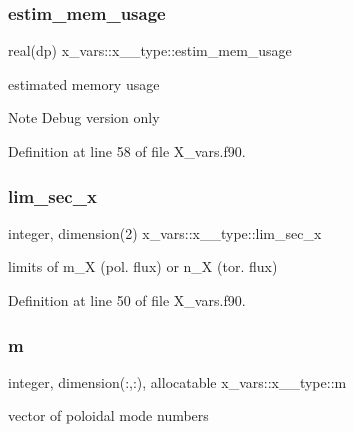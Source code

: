 \subsubsection{\texorpdfstring{estim\+\_\+mem\+\_\+usage}{estim\_mem\_usage}}
{\footnotesize\ttfamily real(dp) x\+\_\+vars\+::x\+\_\+\_\+type\+::estim\+\_\+mem\+\_\+usage}



estimated memory usage 

\begin{DoxyNote}{Note}
Debug version only 
\end{DoxyNote}


Definition at line 58 of file X\+\_\+vars.\+f90.

\mbox{\label{structx__vars_1_1x__1__type_a13c0f5a062916cf55e6bbaa906d0245b}} 
\subsubsection{\texorpdfstring{lim\+\_\+sec\+\_\+x}{lim\_sec\_x}}
{\footnotesize\ttfamily integer, dimension(2) x\+\_\+vars\+::x\+\_\+\_\+type\+::lim\+\_\+sec\+\_\+x}



limits of {\ttfamily m\+\_\+X} (pol. flux) or {\ttfamily n\+\_\+X} (tor. flux) 



Definition at line 50 of file X\+\_\+vars.\+f90.

\mbox{\label{structx__vars_1_1x__1__type_a02aaa9d5638a17b6ed2ab1c46093606c}} 
\subsubsection{\texorpdfstring{m}{m}}
{\footnotesize\ttfamily integer, dimension(\+:,\+:), allocatable x\+\_\+vars\+::x\+\_\+\_\+type\+::m}



vector of poloidal mode numbers 



